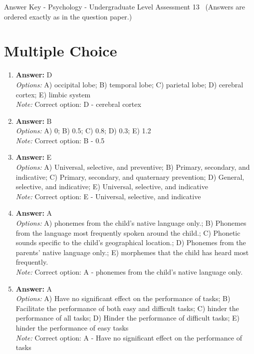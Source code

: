 \documentclass[12pt]{article}
\begin{document}
\begin{center}
Answer Key - Psychology - Undergraduate Level Assessment 13 \
\small (Answers are ordered exactly as in the question paper.)
\end{center}

\section*{Multiple Choice}
\begin{enumerate}[label=\arabic*.]
\item \textbf{Answer:} D
\\ \textit{Options:} A) occipital lobe; B) temporal lobe; C) parietal lobe; D) cerebral cortex; E) limbic system
\\ \textit{Note:} Correct option: D - cerebral cortex
\item \textbf{Answer:} B
\\ \textit{Options:} A) 0; B) 0.5; C) 0.8; D) 0.3; E) 1.2
\\ \textit{Note:} Correct option: B - 0.5
\item \textbf{Answer:} E
\\ \textit{Options:} A) Universal, selective, and preventive; B) Primary, secondary, and indicative; C) Primary, secondary, and quaternary prevention; D) General, selective, and indicative; E) Universal, selective, and indicative
\\ \textit{Note:} Correct option: E - Universal, selective, and indicative
\item \textbf{Answer:} A
\\ \textit{Options:} A) phonemes from the child's native language only.; B) Phonemes from the language most frequently spoken around the child.; C) Phonetic sounds specific to the child's geographical location.; D) Phonemes from the parents' native language only.; E) morphemes that the child has heard most frequently.
\\ \textit{Note:} Correct option: A - phonemes from the child's native language only.
\item \textbf{Answer:} A
\\ \textit{Options:} A) Have no significant effect on the performance of tasks; B) Facilitate the performance of both easy and difficult tasks; C) hinder the performance of all tasks; D) Hinder the performance of difficult tasks; E) hinder the performance of easy tasks
\\ \textit{Note:} Correct option: A - Have no significant effect on the performance of tasks
\end{enumerate}
\end{document}
